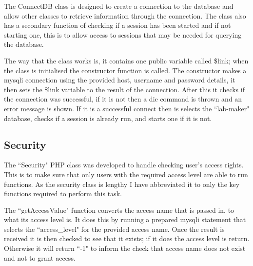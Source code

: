 \documentclass[11pt]{report}
\makeatletter
\newcommand{\phplisting}{\lstset{
  language        = php,
  basicstyle      = \tiny\ttfamily,
  numberstyle     = \tiny,
  keywordstyle    = \color{blue},
  stringstyle     = \color{red},
  identifierstyle = \color{black},
  commentstyle    = \color{gray},
  emph            =[1]{php},
  emphstyle       =[1]\color{darkgray},
  emph            =[2]{if,and,or,else},
  emphstyle       =[2]\color{darkgray},
  numbers = left,
  backgroundcolor=\color{lightgray},
  frame = single, 
  framexleftmargin=3em,
  xleftmargin=3em,
  breaklines= true,
  showstringspaces=false,
  escapeinside={(*@}{@*)}
  }}
\makeatother
\begin{document}
The ConnectDB class is designed to create a connection to the database and allow other classes to retrieve information through the connection. The class also has a secondary function of checking if a session has been started and if not starting one, this is to allow access to sessions that may be needed for querying the database. 






\noindent The way that the class works is, it contains one public variable called \$link; when the class is initialised the constructor function is called. The constructor makes a mysqli connection using the provided host, username and password details, it then sets the \$link variable to the result of the connection. After this it checks if the connection was successful, if it is not then a die command is thrown and an error message is shown. If it is a successful connect then is selects the ``lab-maker" database, checks if a session is already run, and starts one if it is not.

\subsection{Security}
\label{sec:security}

The ``Security" PHP class was developed to handle checking user's access rights. This is to make sure that only users with the required access level are able to run functions. As the security class is lengthy I have abbreviated it to only the key functions required to perform this task.

\noindent The ``getAccessValue" function  converts the access name that is passed in, to what its access level is. It does this by running a prepared mysqli statement that selects the ``access\_level" for the provided access name. Once the result is received it is then checked to see that it exists; if it does the access level is return. Otherwise it will return ``-1" to inform the check that access name does not exist and not to grant access.
\end{document}
